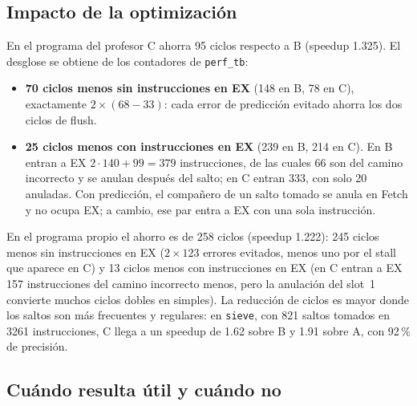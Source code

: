 \documentclass[12pt,a4paper]{article}
\begin{document}
\subsection{Impacto de la optimización}

En el programa del profesor C ahorra 95 ciclos respecto a B (speedup 1.325). El desglose se obtiene de los contadores de \texttt{perf\_tb}:
\begin{itemize}
    \item \textbf{70 ciclos menos sin instrucciones en EX} (148 en B, 78 en C), exactamente $2 \times (68 - 33)$: cada error de predicción evitado ahorra los dos ciclos de flush.
    \item \textbf{25 ciclos menos con instrucciones en EX} (239 en B, 214 en C). En B entran a EX $2 \cdot 140 + 99 = 379$ instrucciones, de las cuales 66 son del camino incorrecto y se anulan después del salto; en C entran 333, con solo 20 anuladas. Con predicción, el compañero de un salto tomado se anula en Fetch y no ocupa EX; a cambio, ese par entra a EX con una sola instrucción.
\end{itemize}
En el programa propio el ahorro es de 258 ciclos (speedup 1.222): 245 ciclos menos sin instrucciones en EX ($2 \times 123$ errores evitados, menos uno por el stall que aparece en C) y 13 ciclos menos con instrucciones en EX (en C entran a EX 157 instrucciones del camino incorrecto menos, pero la anulación del slot~1 convierte muchos ciclos dobles en simples). La reducción de ciclos es mayor donde los saltos son más frecuentes y regulares: en \texttt{sieve}, con 821 saltos tomados en 3261 instrucciones, C llega a un speedup de 1.62 sobre B y 1.91 sobre A, con 92\,\% de precisión.

\subsection{Cuándo resulta útil y cuándo no}
\label{sec:cuando}
\end{document}
